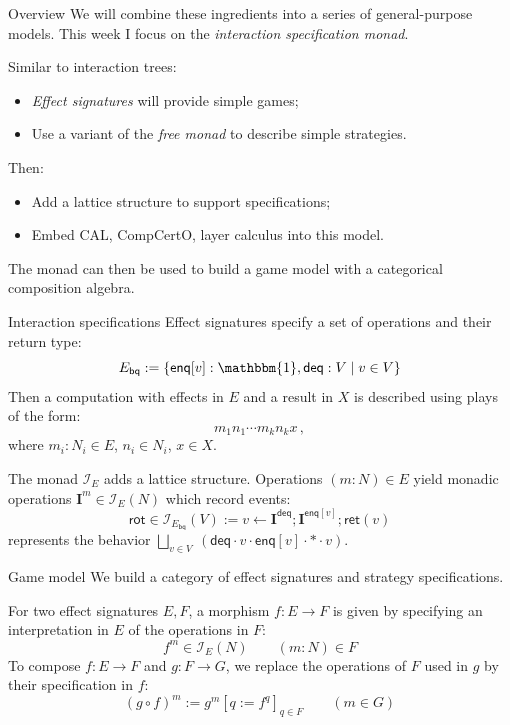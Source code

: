 \documentclass{beamer}
\begin{document}
\begin{frame}{Overview}
  We will combine these ingredients into
  a series of general-purpose models.
  This week I focus on %
  the \emph{interaction specification monad}.

  \vfill
  Similar to interaction trees:
  \begin{itemize}
    \item \emph{Effect signatures} will provide simple games;
    \item Use a variant of the \emph{free monad} to
      describe simple strategies.
  \end{itemize}

  \vfill
  Then:
  \begin{itemize}
    \item Add a lattice structure to support specifications;
    \item Embed CAL, CompCertO, layer calculus into this model.
  \end{itemize}

  \vfill
  The monad can then be used to build a game model
  with a categorical composition algebra.
\end{frame}

\begin{frame}{Interaction specifications}
  Effect signatures specify a set of operations
  and their return type:
  \[
    E_\mathsf{bq} :=
    \{ \mathsf{enq}[v] : \mathbbm{1}, \mathsf{deq} : V \mid v \in V \}
  \]
  Then a computation with effects in $E$ and a result in $X$
  is described using plays of the form:
  \[
    m_1 n_1 \cdots m_k n_k x \,,
  \]
  where $m_i : N_i \in E$, $n_i \in N_i$, $x \in X$.

  \vfill
  The monad $\mathcal{I}_E$ adds a lattice structure.
  Operations $(m : N) \in E$ yield
  monadic operations $\mathbf{I}^m \in \mathcal{I}_E(N)$ which record events:
  \[
    \mathsf{rot} \in \mathcal{I}_{E_\mathsf{bq}}(V)
      := v \leftarrow \mathbf{I}^\mathsf{deq} ;
        \mathbf{I}^{\mathsf{enq}[v]} ; \mathsf{ret}(v)
  \]
  represents the behavior $
    \bigsqcup_{v \in V} \:
       (\mathsf{deq} \cdot v \cdot
        \mathsf{enq}[v] \cdot * \cdot v)$.
\end{frame}

\begin{frame}{Game model}
  We build a category of effect signatures
  and strategy specifications.

  For two effect signatures $E, F$,
  a morphism $f : E \rightarrow F$ is given by
  specifying an interpretation in $E$ of the operations in $F$:
  \[
    f^m \in \mathcal{I}_E(N) \qquad (m : N) \in F
  \]
  To compose $f : E \rightarrow F$ and $g : F \rightarrow G$,
  we replace the operations of $F$ used in $g$ by their
  specification in $f$:
  \[
    (g \circ f)^m := g^m[q := f^q]_{q \in F} \qquad (m \in G)
  \]
\end{frame}
\end{document}
